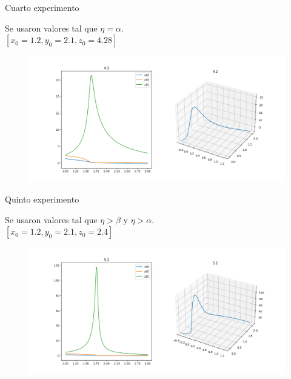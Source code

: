 \documentclass{beamer}
\begin{document}
\begin{frame}
    {Cuarto experimento}

    Se usaron valores tal que $\eta = \alpha$.\\
    $[x_0=1.2, y_0=2.1, z_0=4.28]$

    \begin{figure}[h!]
        \includegraphics[width=\linewidth]{./images/4.png}
    \end{figure}
\end{frame}

\begin{frame}
    {Quinto experimento}

    Se usaron valores tal que $\eta > \beta$ y $\eta > \alpha$.\\
    $[x_0=1.2, y_0=2.1, z_0=2.4]$

    \begin{figure}[h!]
        \includegraphics[width=\linewidth]{./images/5.png}
    \end{figure}
\end{frame}
\end{document}
